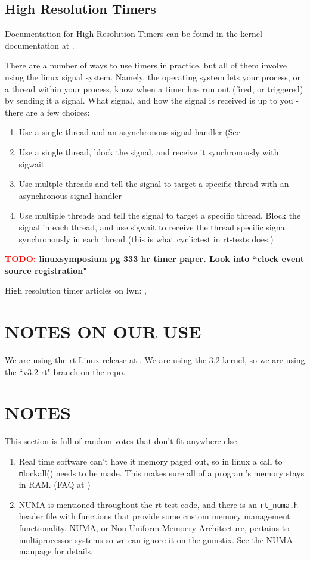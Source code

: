 \documentclass{article}
\newcommand{\TODO}[1]{ {\bf \textcolor{red}{TODO:} #1 }}
\begin{document}
\subsection{High Resolution Timers}
Documentation for High Resolution Timers can be found in the kernel documentation at \cite{highResTimerDoc}.

There are a number of ways to use timers in practice, but all of them involve using the linux signal system. Namely, the operating system lets your process, or a thread within your process, know when a timer has run out (fired, or triggered) by sending it a signal.  What signal, and how the signal is received is up to you - there are a few choices:
\begin{enumerate}
\item Use a single thread and an asynchronous signal handler (See 
\item Use a single thread, block the signal, and receive it synchronously with sigwait
\item Use multple threads and tell the signal to target a specific thread with an asynchronous signal handler
\item Use multiple threads and tell the signal to target a specific thread.  Block the signal in each thread, and use sigwait to receive the thread specific signal synchronously in each thread (this is what cyclictest in rt-tests does.)
\end{enumerate}

\TODO{linuxsymposium pg 333 hr timer paper.  Look into ``clock event source registration"}

High resolution timer articles on lwn: \cite{highResTimerAPI}, \cite{newApproachToKernelTimers}

\section{NOTES ON OUR USE}
We are using the rt Linux release at \cite{RealTimeLinuxPatch}.  We are using the 3.2 kernel, so we are using the ``v3.2-rt" branch on the repo.

\section{NOTES}
This section is full of random votes that don't fit anywhere else.
\begin{enumerate}
\item Real time software can't have it memory paged out, so in linux a call to {\texttt mlockall()} needs to be made.  This makes sure all of a program's memory stays in RAM. (FAQ at \cite{RealTimeLinux})
\item NUMA is mentioned throughout the rt-test code, and there is an \texttt{rt\_numa.h} header file with functions that provide some custom memory management functionality.  NUMA, or Non-Uniform Memoery Architecture, pertains to multiprocessor systems so we can ignore it on the gumstix.  See the NUMA manpage \cite{NUMA} for details.
\end{enumerate}

\end{document}
